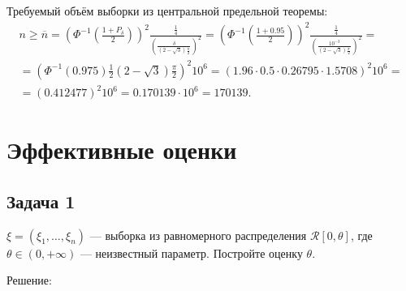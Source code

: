 \documentclass[a4paper,12pt]{article}
\begin{document}
Требуемый объём выборки из центральной предельной теоремы:
\begin{multline*}
    n
    \ge \overline{n}
    = \left( \Phi^{-1} \left( \frac{1 + P_\delta}{2} \right) \right)^2 \frac{\frac{1}{4}}{\left( \frac{\delta}{\left( 2 - \sqrt{3} \right) \frac{\pi}{2}} \right)^2}
    = \left( \Phi^{-1} \left( \frac{1 + 0.95}{2} \right) \right)^2 \frac{\frac{1}{4}}{\left( \frac{10^{-3}}{\left( 2 - \sqrt{3} \right) \frac{\pi}{2}} \right)^2} = \\
    = \left( \Phi^{-1} ( 0.975 ) \frac{1}{2} \left( 2 - \sqrt{3} \right) \frac{\pi}{2} \right)^2 10^6
    = \left( 1.96 \cdot 0.5 \cdot 0.26795 \cdot 1.5708 \right)^2 10^6 = \\
    = \left( 0.412477 \right)^2 10^6
    = 0.170139 \cdot 10^6
    = 170 139 .
\end{multline*}

\section*{Эффективные оценки}

\subsection*{Задача 1}

$\xi = (\xi_1, \dots, \xi_n)$ --- выборка из равномерного распределения $\mathcal{R}[0, \theta]$, где $\theta \in (0, + \infty)$ --- неизвестный параметр.
Постройте оценку $\theta$.

Решение:
\end{document}
